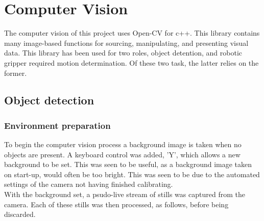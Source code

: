 \documentclass[11pt,a4paper]{report}
\begin{document}
\chapter{Computer Vision}
The computer vision of this project uses Open-CV for c++. This library contains many image-based functions for sourcing, manipulating, and presenting visual data. This library has been used for two roles, object detention, and robotic gripper required motion determination. Of these two task, the latter relies on the former. 
\section{Object detection}
\subsection{Environment preparation}
To begin the computer vision process a background image is taken when no objects are present. A keyboard control was added, 'Y', which allows a new background to be set. This was seen to be useful, as a background image taken on start-up, would often be too bright. This was seen to be due to the automated settings of the camera not having finished calibrating.\\
With the background set, a psudo-live stream of stills was captured from the camera. Each of these stills was then processed, as follows, before being discarded. 
\end{document}
